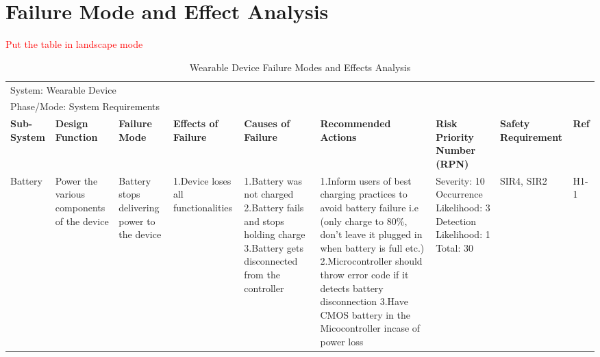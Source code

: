 \documentclass[12pt, titlepage]{article}
\begin{document}
\section{Failure Mode and Effect Analysis}
\textcolor{red}{Put the table in landscape mode}

\begin{landscape}
\begin{table}[H]
\centering
    \caption{Wearable Device Failure Modes and Effects Analysis}
	
    \begin{tabular}{| p{} | p{}  | p{} | p{} | p{} | p{} | p{} | p{} | p{} |}
    \hline
    
    \multicolumn{9}{|l|}{System: Wearable Device} \\
    \multicolumn{9}{|l|}{Phase/Mode: System Requirements} \\ \hline
    \textbf{Sub-System} & \textbf{Design Function} & \textbf{Failure Mode} & \textbf{Effects of Failure} & \textbf{Causes of Failure} & \textbf{Recommended Actions} & \textbf{Risk Priority Number (RPN)} & \textbf{Safety Requirement} & \textbf{Ref} \\ \hline

    Battery & Power the various components of the device  & Battery stops delivering power to the device & 1.Device loses all functionalities & 1.Battery was not charged \newline 2.Battery fails and stops holding charge \newline 3.Battery gets disconnected from the controller & 1.Inform users of best charging practices to avoid battery failure i.e (only charge to 80\%, don't leave it plugged in when battery is full etc.) \newline 2.Microcontroller should throw error code if it detects battery disconnection \newline 3.Have CMOS battery in the Micocontroller incase of power loss & Severity: 10 \newline Occurrence Likelihood: 3 \newline Detection Likelihood: 1 \newline Total: 30 & SIR4, SIR2 & H1-1 \\ \cline{1-9}
    
    \end{tabular}

\end{table}
    

\end{landscape}
\end{document}
